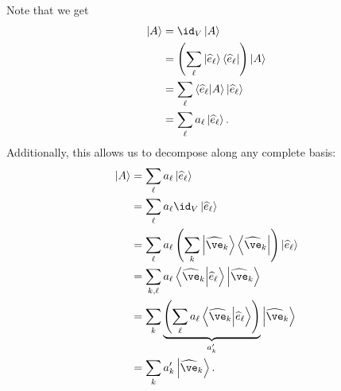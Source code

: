 \documentclass[10pt]{mypackage}
\begin{document}
Note that we get
\begin{align*}
  \ket{A} &= \id_{V}\ket{A}\\
          &= \left(\sum_{\ell} \ket{\widehat{e}_{\ell}}\bra{\widehat{e}_{\ell}}\right)\ket{A}\\
          &= \sum_{\ell}\braket{\widehat{e}_{\ell}}{A}\ket{\widehat{e}_{\ell}}\\
          &= \sum_{\ell}a_{\ell}\ket{\widehat{e}_{\ell}}.
\end{align*}
Additionally, this allows us to decompose along any complete basis:
\begin{align*}
  \ket{A} &= \sum_{\ell}a_{\ell}\ket{\widehat{e}_{\ell}}\\
          &= \sum_{\ell}a_{\ell}\id_{V}\ket{\widehat{e}_{\ell}}\\
          &= \sum_{\ell}a_{\ell}\left(\sum_{k}\ket{\widehat{\ve}_k}\bra{\widehat{\ve}_k}\right)\ket{\widehat{e}_{\ell}}\\
          &= \sum_{k,\ell}a_{\ell}\braket{\widehat{\ve}_{k}}{\widehat{e}_{\ell}}\ket{\widehat{\ve}_k}\\
          &= \sum_{k}\underbrace{\left(\sum_{\ell}a_{\ell}\braket{\widehat{\ve}_k}{\widehat{e}_{\ell}}\right)}_{a_{k}'}\ket{\widehat{\ve}_k}\\
          &= \sum_{k}a_k'\ket{\widehat{\ve}_k}.
\end{align*}
\end{document}
